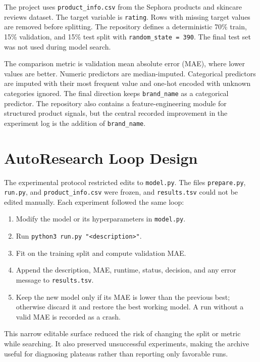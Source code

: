 The project uses \texttt{product\_info.csv} from the Sephora products and skincare reviews dataset. The target variable is \texttt{rating}. Rows with missing target values are removed before splitting. The repository defines a deterministic 70\% train, 15\% validation, and 15\% test split with \texttt{random\_state = 390}. The final test set was not used during model search.

The comparison metric is validation mean absolute error (MAE), where lower values are better. Numeric predictors are median-imputed. Categorical predictors are imputed with their most frequent value and one-hot encoded with unknown categories ignored. The final direction keeps \texttt{brand\_name} as a categorical predictor. The repository also contains a feature-engineering module for structured product signals, but the central recorded improvement in the experiment log is the addition of \texttt{brand\_name}.

\section{AutoResearch Loop Design}

The experimental protocol restricted edits to \texttt{model.py}. The files \texttt{prepare.py}, \texttt{run.py}, and \texttt{product\_info.csv} were frozen, and \texttt{results.tsv} could not be edited manually. Each experiment followed the same loop:

\begin{enumerate}
    \item Modify the model or its hyperparameters in \texttt{model.py}.
    \item Run \texttt{python3 run.py "<description>"}.
    \item Fit on the training split and compute validation MAE.
    \item Append the description, MAE, runtime, status, decision, and any error message to \texttt{results.tsv}.
    \item Keep the new model only if its MAE is lower than the previous best; otherwise discard it and restore the best working model. A run without a valid MAE is recorded as a crash.
\end{enumerate}

This narrow editable surface reduced the risk of changing the split or metric while searching. It also preserved unsuccessful experiments, making the archive useful for diagnosing plateaus rather than reporting only favorable runs.

